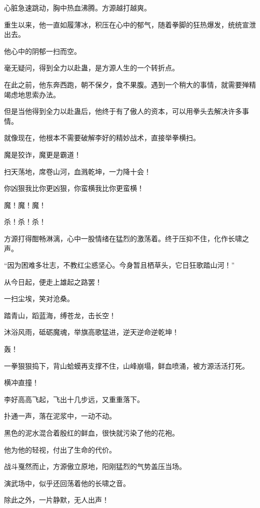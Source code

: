 \begin{this_body}
心脏急速跳动，胸中热血沸腾。方源越打越爽。

重生以来，他一直如履薄冰，积压在心中的郁气，随着拳脚的狂热爆发，统统宣泄出去。

他心中的阴郁一扫而空。

毫无疑问，得到全力以赴蛊，是方源人生的一个转折点。

在此之前，他东奔西跑，朝不保夕，食不果腹。遇到一个稍大的事情，就需要殚精竭虑地思索办法。

但是当他得到全力以赴蛊后，他终于有了傲人的资本，可以用拳头去解决许多事情。

就像现在，他根本不需要破解李好的精妙战术，直接举拳横扫。

魔是狡诈，魔更是霸道！

扫天荡地，席卷山河，血溅乾坤，一力降十会！

你凶狠我比你更凶狠，你蛮横我比你更蛮横！

魔！魔！魔！

杀！杀！杀！

方源打得酣畅淋漓，心中一股情绪在猛烈的激荡着。终于压抑不住，化作长啸之声。

“因为困难多壮志，不教红尘惑坚心。今身暂且栖草头，它日狂歌踏山河！”

从今日起，便走上雄起之路罢！

一扫尘埃，笑对沧桑。

踏青山，蹈蓝海，缚苍龙，击长空！

沐浴风雨，砥砺魔魂，举旗高歌猛进，逆天逆命逆乾坤！

轰！

一拳狠狠捣下，背山蛤蟆再支撑不住，山峰崩塌，鲜血喷涌，被方源活活打死。

横冲直撞！

李好高高飞起，飞出十几步远，又重重落下。

扑通一声，落在泥浆中，一动不动。

黑色的泥水混合着殷红的鲜血，很快就污染了他的花袍。

他为他的轻视，付出了生命的代价。

战斗戛然而止，方源傲立原地，阳刚猛烈的气势盖压当场。

演武场中，似乎还回荡着他的长啸之音。

除此之外，一片静默，无人出声！

\end{this_body}

